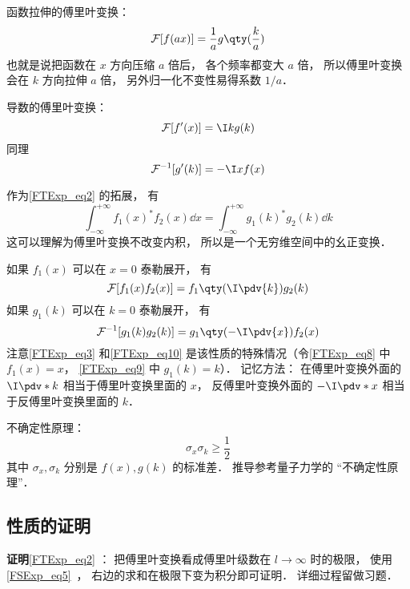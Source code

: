 函数拉伸的傅里叶变换：
\begin{equation}
\mathcal F[f(ax)] = \frac{1}{a} g\qty(\frac{k}{a})
\end{equation}
也就是说把函数在 $x$ 方向压缩 $a$ 倍后， 各个频率都变大 $a$ 倍， 所以傅里叶变换会在 $k$ 方向拉伸 $a$ 倍， 另外归一化不变性易得系数 $1/a$．

导数的傅里叶变换：
\begin{equation}\label{FTExp_eq3}
\mathcal F [f'(x)] = \I k g(k)
\end{equation}
同理
\begin{equation}\label{FTExp_eq10}
\mathcal F^{-1} [g'(k)] = -\I x f(x)
\end{equation}

作为\autoref{FTExp_eq2} 的拓展， 有
\begin{equation}
\int_{-\infty}^{+\infty} f_1(x)^* f_2(x) \dd{x} = \int_{-\infty}^{+\infty} g_1(k)^* g_2(k) \dd{k}
\end{equation}
这可以理解为傅里叶变换不改变内积， 所以是一个无穷维空间中的幺正变换．

如果 $f_1(x)$ 可以在 $x = 0$ 泰勒展开， 有
\begin{equation}\label{FTExp_eq8}
\mathcal{F}[f_1(x) f_2(x)] = f_1\qty(\I \pdv{k}) g_2(k)
\end{equation}
如果 $g_1(k)$ 可以在 $k = 0$ 泰勒展开， 有
\begin{equation}\label{FTExp_eq9}
\mathcal{F}^{-1}[g_1(k) g_2(k)] = g_1\qty(-\I \pdv{x}) f_2(x)
\end{equation}
注意\autoref{FTExp_eq3} 和\autoref{FTExp_eq10} 是该性质的特殊情况（令\autoref{FTExp_eq8} 中 $f_1(x) = x$， \autoref{FTExp_eq9} 中 $g_1(k) = k$）． 记忆方法： 在傅里叶变换外面的 $\I\pdv*{k}$ 相当于傅里叶变换里面的 $x$， 反傅里叶变换外面的 $-\I\pdv*{x}$ 相当于反傅里叶变换里面的 $k$．

不确定性原理：
\begin{equation}
\sigma_x \sigma_k \geqslant \frac{1}{2}
\end{equation}
其中 $\sigma_x, \sigma_k$ 分别是 $f(x), g(k)$ 的标准差． 推导参考量子力学的 “不确定性原理”．

\subsection{性质的证明}

\textbf{证明}\autoref{FTExp_eq2} ： 把傅里叶变换看成傅里叶级数在 $l \to \infty$ 时的极限， 使用\autoref{FSExp_eq5}~， 右边的求和在极限下变为积分即可证明． 详细过程留做习题．

